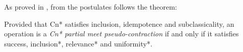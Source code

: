 As proved in \citet{Santos2016}, from the postulates follows the theorem:

\begin{theorem}
    Provided that \textsf{Cn*} satisfies inclusion, idempotence and subclassicality, an operation is a \textit{\textsf{Cn*} partial meet pseudo-contraction} if and only if it satisfies success, inclusion*, relevance* and uniformity*. 
\end{theorem}



